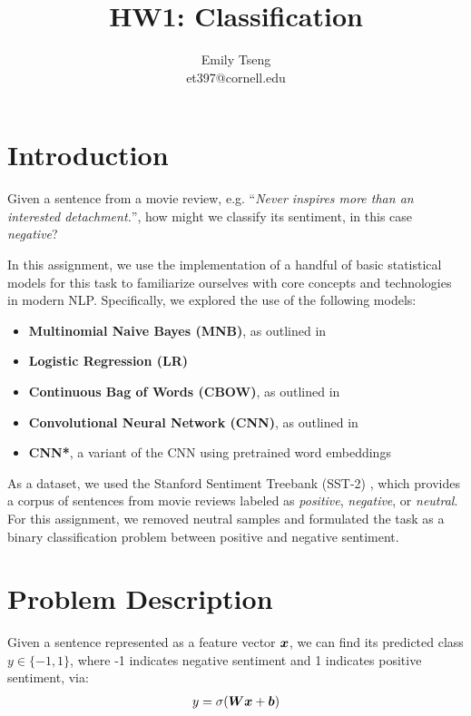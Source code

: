 \documentclass[11pt]{article}
\title{HW1: Classification}
\author{Emily Tseng \\ et397@cornell.edu}
\begin{document}
\maketitle{}
\section{Introduction}

Given a sentence from a movie review, e.g. ``\textit{Never inspires more than an interested detachment.}'', how might we classify its sentiment, in this case \textit{negative}? 

In this assignment, we use the implementation of a handful of basic statistical models for this task to familiarize ourselves with core concepts and technologies in modern NLP. Specifically, we explored the use of the following models:

\begin{itemize}
  \item \textbf{Multinomial Naive Bayes (MNB)}, as outlined in \cite{wang2012baselines}
  \item \textbf{Logistic Regression (LR)}
  \item \textbf{Continuous Bag of Words (CBOW)}, as outlined in \cite{mikolov2013efficient}
  \item \textbf{Convolutional Neural Network (CNN)}, as outlined in \cite{kim2014convolutional}
  \item \textbf{CNN*}, a variant of the CNN using pretrained word embeddings
\end{itemize}

As a dataset, we used the Stanford Sentiment Treebank (SST-2) \citep{socher2013recursive}, which provides a corpus of sentences from movie reviews labeled as \textit{positive}, \textit{negative}, or \textit{neutral}. For this assignment, we removed neutral samples and formulated the task as a binary classification problem between positive and negative sentiment.


\section{Problem Description}

Given a sentence represented as a feature vector $\boldsymbol{x}$, we can find its predicted class $y \in \{-1, 1\}$, where -1 indicates negative sentiment and 1 indicates positive sentiment, via:
\begin{align}
  y = \sigma(\boldsymbol{W}\boldsymbol{x} + \boldsymbol{b})
\end{align}
\end{document}
